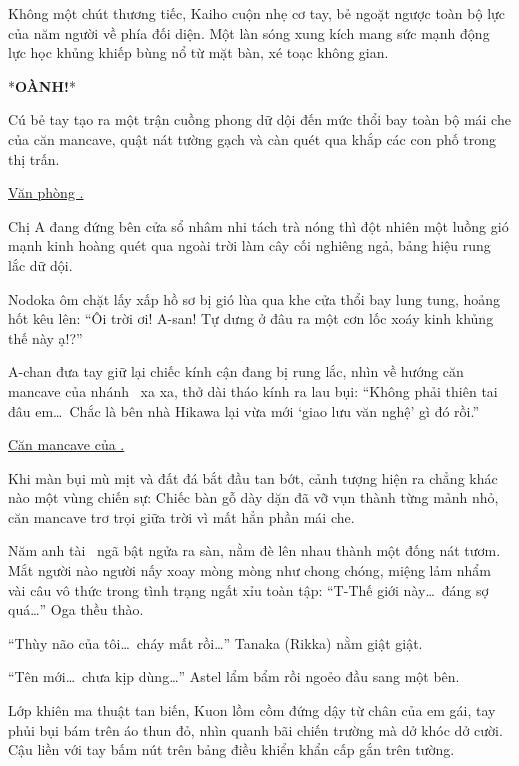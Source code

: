 \documentclass[../main.tex]{subfiles}
\begin{document}
Không một chút thương tiếc, Kaiho cuộn nhẹ cơ tay, bẻ ngoặt ngược toàn bộ lực của năm người về phía đối diện. Một làn sóng xung kích mang sức mạnh động lực học khủng khiếp bùng nổ từ mặt bàn, xé toạc không gian.

    *{\textbf{\Large OÀNH!}}*

Cú bẻ tay tạo ra một trận cuồng phong dữ dội đến mức thổi bay toàn bộ mái che của căn mancave, quật nát tường gạch và càn quét qua khắp các con phố trong thị trấn.

\ct

\begin{center}
    \uline{Văn phòng \hll.}
\end{center}

Chị A đang đứng bên cửa sổ nhâm nhi tách trà nóng thì đột nhiên một luồng gió mạnh kinh hoàng quét qua ngoài trời làm cây cối nghiêng ngả, bảng hiệu rung lắc dữ dội.

Nodoka ôm chặt lấy xấp hồ sơ bị gió lùa qua khe cửa thổi bay lung tung, hoảng hốt kêu lên: ``Ôi trời ơi! A-san! Tự dưng ở đâu ra một cơn lốc xoáy kinh khủng thế này ạ!?''

A-chan đưa tay giữ lại chiếc kính cận đang bị rung lắc, nhìn về hướng căn mancave của nhánh \hls\ xa xa, thở dài tháo kính ra lau bụi: ``Không phải thiên tai đâu em\dots\ Chắc là bên nhà Hikawa lại vừa mới `giao lưu văn nghệ' gì đó rồi.''

\ct

\begin{center}
    \uline{Căn mancave của \hls.}
\end{center}

Khi màn bụi mù mịt và đất đá bắt đầu tan bớt, cảnh tượng hiện ra chẳng khác nào một vùng chiến sự: Chiếc bàn gỗ dày dặn đã vỡ vụn thành từng mảnh nhỏ, căn mancave trơ trọi giữa trời vì mất hẳn phần mái che.

Năm anh tài \hls\ ngã bật ngửa ra sàn, nằm đè lên nhau thành một đống nát tươm. Mắt người nào người nấy xoay mòng mòng như chong chóng, miệng lảm nhẩm vài câu vô thức trong tình trạng ngất xỉu toàn tập: ``T-Thế giới này\dots\ đáng sợ quá\dots'' Oga thều thào.

``Thùy não của tôi\dots\ cháy mất rồi\dots'' Tanaka (Rikka) nằm giật giật.

``Tên mới\dots\ chưa kịp dùng\dots'' Astel lẩm bẩm rồi ngoẻo đầu sang một bên.

Lớp khiên ma thuật tan biến, Kuon lồm cồm đứng dậy từ chân của em gái, tay phủi bụi bám trên áo thun đỏ, nhìn quanh bãi chiến trường mà dở khóc dở cười. Cậu liền với tay bấm nút trên bảng điều khiển khẩn cấp gắn trên tường.
\end{document}
